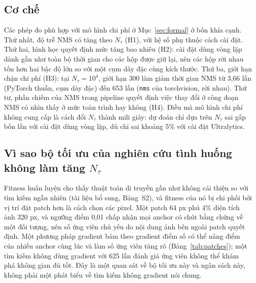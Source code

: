 \documentclass[a4paper,fleqn]{cas-dc}
\newcommand{\Ntau}{N_{\tau}}
\begin{document}
\subsection{Cơ chế}
Các phép đo phù hợp với mô hình chi phí ở Mục~\ref{sec:formal} ở bốn khía cạnh. Thứ nhất, độ trễ NMS có tăng theo $\Ntau$ (H1), với hệ số phụ thuộc cách cài đặt. Thứ hai, hình học quyết định mức tăng bao nhiêu (H2): cài đặt dùng vòng lặp dành gần như toàn bộ thời gian cho các hộp được giữ lại, nên các hộp rời nhau tốn hơn hai bậc độ lớn so với một cụm dày đặc cùng kích thước. Thứ ba, giới hạn chặn chi phí (H3): tại $\Ntau=10^4$, giới hạn 300 làm giảm thời gian NMS từ 3,66 lần (PyTorch thuần, cụm dày đặc) đến 653 lần (\texttt{nms} của torchvision, rời nhau). Thứ tư, phần chiếm của NMS trong pipeline quyết định việc thay đổi ở công đoạn NMS có nhìn thấy ở mức toàn trình hay không (H4). Điều mà mô hình chi phí không cung cấp là cách đổi $\Ntau$ thành mili giây: dự đoán chỉ dựa trên $\Ntau$ sai gấp bốn lần với cài đặt dùng vòng lặp, dù chỉ sai khoảng 5\% với cài đặt Ultralytics.

\subsection{Vì sao bộ tối ưu của nghiên cứu tình huống không làm tăng $\Ntau$}
Fitness huấn luyện cho thấy thuật toán di truyền gần như không cải thiện so với tìm kiếm ngẫu nhiên (tài liệu bổ sung, Bảng~S2), và fitness của nó bị chi phối bởi vị trí đặt patch hơn là cách chọn các pixel. Một patch 64 px phủ 4\% diện tích ảnh 320 px, và ngưỡng điểm 0,01 chấp nhận mọi anchor có chút bằng chứng về một đối tượng, nên số ứng viên chủ yếu do nội dung ảnh bên ngoài patch quyết định. Một phương pháp gradient bám theo gradient điểm số có thể nâng điểm của nhiều anchor cùng lúc và làm số ứng viên tăng rõ (Bảng~\ref{tab:patches}); một tìm kiếm không dùng gradient với 625 lần đánh giá ứng viên không thể khám phá không gian đủ tốt. Đây là một quan sát về bộ tối ưu này và ngân sách này, không phải một phát biểu về tìm kiếm không gradient nói chung.
\end{document}
